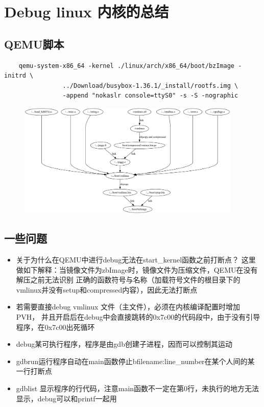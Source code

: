 \section{Debug linux 内核的总结}
  \subsection{QEMU脚本}
  \begin{lstlisting}
    qemu-system-x86_64 -kernel ./linux/arch/x86_64/boot/bzImage -initrd \
                ../Download/busybox-1.36.1/_install/rootfs.img \
                -append "nokaslr console=ttyS0" -s -S -nographic
  \end{lstlisting}
 \begin{figure}[htbp]
  \begin{center}
  \includegraphics[width=0.95\textwidth]{Pictures/vmlinux_arch.pdf}
\end{center}
 \end{figure}
  \subsection{一些问题}
    \begin{itemize}
      \item 关于为什么在QEMU中进行debug无法在start\_kernel函数之前打断点？
      这里做如下解释：当镜像文件为zbImage时，镜像文件为压缩文件，QEMU在没有解压之前无法识别
      正确的函数符号与名称（加载符号文件的根目录下的vmlinux并没有setup和compressed内容），因此无法打断点
      \item  若需要直接debug vmlinux 文件（主文件），必须在内核编译配置时增加PVH，
      并且开启后在debug中会直接跳转的0x7c00的代码段中，由于没有引导程序，在0x7c00出死循环
      \item debug\quad 某可执行程序，程序是由gdb创建子进程，因而可以控制其运动
      \item gdbrun\quad 运行程序自动在main函数停止\quad b\quad filename:line\_number\quad 在某个人间的某一行打断点
      \item gdb\quad list 显示程序的行代码，注意main函数不一定在第0行，未执行的地方无法显示，debug可以和printf一起用
   \end{itemize}
    